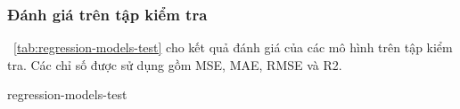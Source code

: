 \subsubsection{Đánh giá trên tập kiểm tra}

\tablename~\ref{tab:regression-models-test} cho kết quả đánh giá của các mô
hình trên tập kiểm tra. Các chỉ số được sử dụng gồm MSE, MAE, RMSE và R2.

\begin{table}[htbp]
  \centering
  \caption{Kết quả các chỉ số của các mô hình trên tập kiểm tra}
  \label{tab:regression-models-test}
  {regression-models-test}
\end{table}


\par

\par

